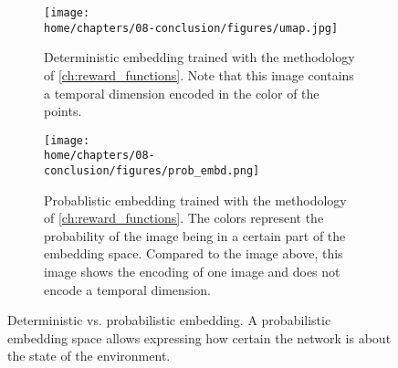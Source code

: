 \documentclass[\home/main.tex]{subfiles}
\begin{document}
\begin{figure}[htpb]{}
    \centering
    \begin{subfigure}[b]{0.90\textwidth}
        \centering
        \texttt{[image: \\home/chapters/08-conclusion/figures/umap.jpg]}
        \caption{Deterministic embedding trained with the methodology of \cref{ch:reward_functions}. Note that this image contains a temporal dimension encoded in the color of the points.}
        \label{fig:determinstic_embd}
    \end{subfigure}
    \par\bigskip %
    \begin{subfigure}[b]{0.90\textwidth}
        \centering
        \texttt{[image: \\home/chapters/08-conclusion/figures/prob\_embd.png]}
        \caption{Probablistic embedding trained with the methodology of \cref{ch:reward_functions}. The colors represent the probability of the image being in a certain part of the embedding space. Compared to the image above, this image shows the encoding of one image and does not encode a temporal dimension.}
        \label{fig:prob_embd}
    \end{subfigure}

    \caption[]{Deterministic vs. probabilistic embedding. A probabilistic embedding space allows expressing how certain the network is about the state of the environment.}
    \label{fig:stoch_embd}
\end{figure}




\end{document}
